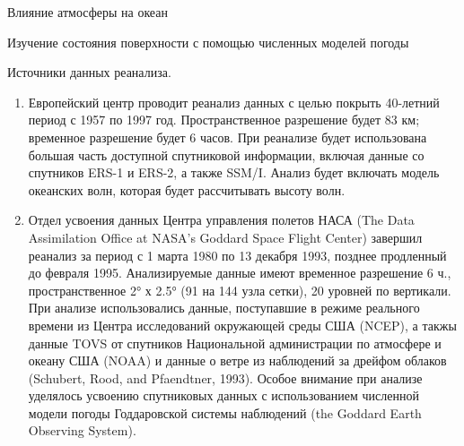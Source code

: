 \begin{chapter}{Влияние атмосферы на океан}
\begin{section}{Изучение состояния поверхности с помощью численных моделей погоды}
\begin{paragraph}{Источники данных реанализа.}
\begin{enumerate}
\item
Европейский центр проводит реанализ данных с целью покрыть 40-летний
период с 1957 по 1997 год. Пространственное разрешение будет 83 км;
временное разрешение будет 6 часов. При реанализе будет использована
большая часть доступной спутниковой информации, включая данные со
спутников ERS-1 и ERS-2, а также SSM/I. Анализ будет включать модель
океанских волн, которая будет рассчитывать высоту волн.
%


\item
Отдел усвоения данных Центра управления полетов НАСА (The Data
Assimilation Office at NASA's Goddard Space Flight Center) завершил
реанализ за период с 1 марта 1980 по 13 декабря 1993, позднее
продленный до февраля 1995. Анализируемые данные имеют временное
разрешение 6 ч., пространственное 2° х 2.5° (91 на 144 узла сетки), 20
уровней по вертикали. При анализе использовались данные, поступавшие в
режиме реального времени из Центра исследований окружающей среды США
(NCEP), а такжы данные TOVS от спутников Национальной администрации по
атмосфере и океану США (NOAA) и данные о ветре из наблюдений за
дрейфом облаков (Schubert, Rood, and Pfaendtner, 1993). Особое
внимание при анализе уделялось усвоению спутниковых данных с
использованием численной модели погоды Годдаровской системы наблюдений
(the Goddard Earth Observing System).
\end{enumerate}
\end{paragraph}
\end{section}


\end{chapter}
